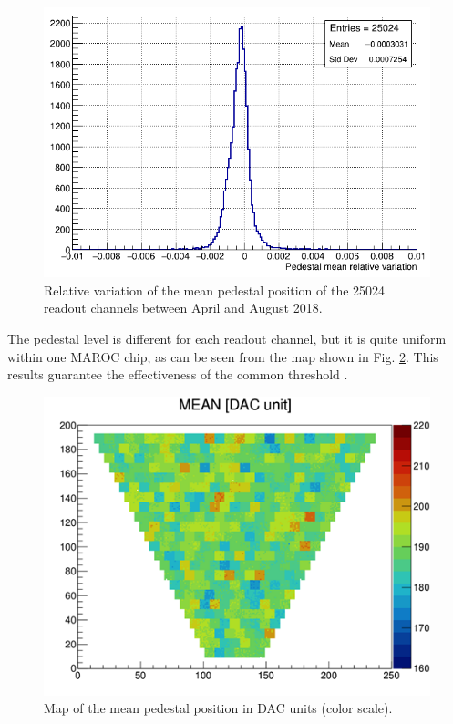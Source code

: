 \documentclass[5p,times,twocolumn]{elsarticle}
\begin{document}
\begin{figure}[t]
\begin{center}
\includegraphics[width=1.0\columnwidth]{PedestalMeanVariation.png}
\end{center}
\caption{Relative variation of the mean pedestal position of the 25024 readout channels between April and August 2018.}
\label{fig:PedestalMean}
\end{figure}

The pedestal level is different for each readout channel, but it is quite uniform within one MAROC chip, as can be seen from the map shown in Fig. \ref{fig:PedestalMap}. This results guarantee the effectiveness of the common threshold .


\begin{figure}[t]
\begin{center}
\includegraphics[width=1.0\columnwidth]{PedestalMap.png}
\end{center}
\caption{Map of the mean pedestal position in DAC units (color scale).}
\label{fig:PedestalMap}
\end{figure}
\end{document}
